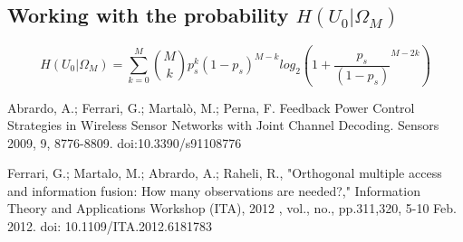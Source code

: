 \documentclass[a4paper,10pt]{article}
\begin{document}
\subsection{Working with the probability $H(U_0|\Omega_M)$}
\begin{equation}
  H(U_0|\Omega_M)  = \sum_{k=0}^M \binom{M}{k} p_s^k (1-p_s)^{M-k} log_2\left ( 1 +  {\frac{p_s}{(1-p_s)}}^{M-2k} \right )
\end{equation}

 \begin{thebibliography}{99}
Abrardo, A.; Ferrari, G.; Martalò, M.; Perna, F. Feedback Power Control Strategies in 
Wireless Sensor Networks with Joint Channel Decoding. Sensors 2009, 9, 8776-8809.
doi:10.3390/s91108776
 
Ferrari, G.; Martalo, M.; Abrardo, A.; Raheli, R., "Orthogonal multiple access 
and information fusion: How many observations are needed?," Information Theory and 
Applications Workshop (ITA), 2012 , vol., no., pp.311,320, 5-10 Feb. 2012.
doi: 10.1109/ITA.2012.6181783
 
 \end{thebibliography} 
\end{document}
